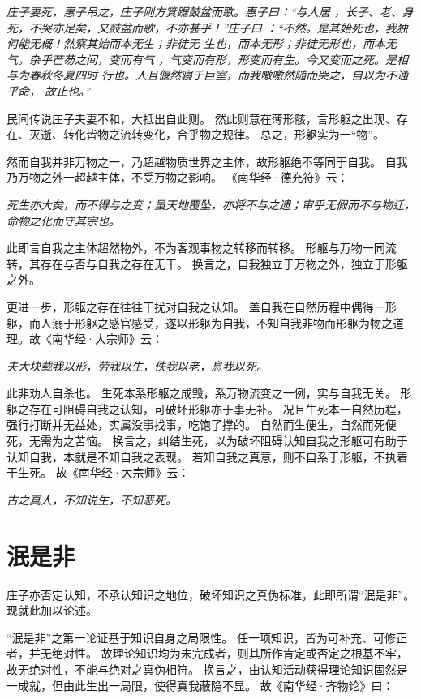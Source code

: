 \documentclass[11pt]{article}
\begin{document}
\textit{庄子妻死，惠子吊之，庄子则方箕踞鼓盆而歌。惠子曰：“与人居 ，长子、老、身死，不哭亦足矣，又鼓盆而歌，不亦甚乎！”庄子曰 ：“不然。是其始死也，我独何能无概！然察其始而本无生；非徒无 生也，而本无形；非徒无形也，而本无气。杂乎芒芴之间，变而有气 ，气变而有形，形变而有生。今又变而之死。是相与为春秋冬夏四时 行也。人且偃然寝于巨室，而我噭噭然随而哭之，自以为不通乎命， 故止也。”}

民间传说庄子夫妻不和，大抵出自此则。
然此则意在薄形骸，言形躯之出现、存在、灭逝、转化皆物之流转变化，合乎物之规律。
总之，形躯实为一“物”。

\newline

然而自我并非万物之一，乃超越物质世界之主体，故形躯绝不等同于自我。
自我乃万物之外一超越主体，不受万物之影响。
《南华经·德充符》云：


\textit{死生亦大矣，而不得与之变；虽天地覆坠，亦将不与之遗；审乎无假而不与物迁，命物之化而守其宗也。}

此即言自我之主体超然物外，不为客观事物之转移而转移。
形躯与万物一同流转，其存在与否与自我之存在无干。
换言之，自我独立于万物之外，独立于形躯之外。

\newline

更进一步，形躯之存在往往干扰对自我之认知。
盖自我在自然历程中偶得一形躯，而人溺于形躯之感官感受，遂以形躯为自我，不知自我非物而形躯为物之道理。故《南华经·大宗师》云：

\textit{夫大块载我以形，劳我以生，佚我以老，息我以死。}

此非劝人自杀也。
生死本系形躯之成毁，系万物流变之一例，实与自我无关。
形躯之存在可阻碍自我之认知，可破坏形躯亦于事无补。
况且生死本一自然历程，强行打断并无益处，实属没事找事，吃饱了撑的。
自然而生便生，自然而死便死，无需为之苦恼。
换言之，纠结生死，以为破坏阻碍认知自我之形躯可有助于认知自我，本就是不知自我之表现。
若知自我之真意，则不自系于形躯，不执着于生死。
故《南华经·大宗师》云：

\textit{古之真人，不知说生，不知恶死。}

\section{泯是非}
庄子亦否定认知，不承认知识之地位，破坏知识之真伪标准，此即所谓“泯是非”。
现就此加以论述。

\newline

“泯是非”之第一论证基于知识自身之局限性。
任一项知识，皆为可补充、可修正者，并无绝对性。
故理论知识均为未完成者，则其所作肯定或否定之根基不牢，故无绝对性，不能与绝对之真伪相符。
换言之，由认知活动获得理论知识固然是一成就，但由此生出一局限，使得真我蔽隐不显。
故《南华经·齐物论》曰：
\end{document}
